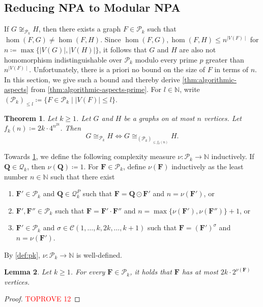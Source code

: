 \documentclass[11pt,a4paper]{article}
\theoremstyle{plain}
\newtheorem{thm}{Theorem}[section]
\newtheorem{lem}[thm]{Lemma}
\theoremstyle{remark}
\theoremstyle{definition}
\newcommand{\cyclicpermutations}{\mathscr{C}(1,\dots, k, 2k, \dots, k+1)}
\begin{document}
\subsection{Reducing NPA to Modular NPA}

If $G \not\cong_{\mathcal{P}_k} H$, then there exists a graph $F \in \mathcal{P}_k$ such that $\hom(F, G) \neq \hom(F, H)$.
Since $\hom(F, G), \hom(F, H) \leq n^{\mid V(F)\mid }$ for $n \coloneqq \max\{\lvert V(G) \rvert , \lvert V(H) \rvert \}$, 
it follows that $G$ and $H$ are also not homomorphism indistinguishable over $\mathcal{P}_k$ modulo every prime $p$ greater than $n^{\mid V(F)\mid }$.
Unfortunately, there is a priori no bound on the size of $F$ in terms of $n$.
In this section, we give such a bound and thereby derive \cref{thm:algorithmic-aspects} from \cref{thm:algorithmic-aspects-prime}.
For $l \in \mathbb{N}$, 
write $(\mathcal{P}_k)_{\leq l} \coloneqq \{ F \in \mathcal{P}_k \mid \lvert V(F)\lvert  \leq l\}$.

\begin{thm} \label{thm:witness-function}
	Let $k \geq 1$.
	Let $G$ and $H$ be a graphs on at most $n$ vertices.
	Let $f_k(n) \coloneqq 2k \cdot 4^{n^{2k}}$.
	Then 
	\[
		G \cong_{\mathcal{P}_k} H \iff
		G \cong_{(\mathcal{P}_k)_{\leq f_k(n)}} H.
	\]
\end{thm}

Towards \cref{thm:witness-function},
we define  the following complexity measure $\nu \colon \mathcal{P}_k \to \mathbb{N}$ inductively. If $\boldsymbol{Q} \in \mathcal{Q}_k$, then $\nu(\boldsymbol{Q}) \coloneqq 1$.
For $\boldsymbol{F} \in \mathcal{P}_k$, define $\nu(\boldsymbol{F})$ inductively as the least number $n \in \mathbb{N}$ such that there exist
\begin{enumerate}
	\item $\boldsymbol{F}' \in \mathcal{P}_k$ and $\boldsymbol{Q} \in \mathcal{Q}_k^P$ such that $\boldsymbol{F} = \boldsymbol{Q} \odot \boldsymbol{F}'$ and $n = \nu(\boldsymbol{F}')$, or
	\item $\boldsymbol{F}', \boldsymbol{F}'' \in \mathcal{P}_k$ such that $\boldsymbol{F} = \boldsymbol{F}' \cdot \boldsymbol{F}''$ and $n = \max\{ \nu(\boldsymbol{F}'), \nu(\boldsymbol{F}'')\} +1$, or
	\item $\boldsymbol{F}' \in \mathcal{P}_k$ and $\sigma \in \cyclicpermutations$ such that $\boldsymbol{F} = (\boldsymbol{F}')^\sigma$ and $n = \nu(\boldsymbol{F}')$.
\end{enumerate}
By \cref{def:pk}, $\nu \colon \mathcal{P}_k \to \mathbb{N}$ is well-defined.
\begin{lem} \label{lem:nu-size}
	Let $k \geq 1$.
	For every $\boldsymbol{F} \in \mathcal{P}_k$, it holds that $\boldsymbol{F}$ has at most $2k \cdot 2^{\nu(\boldsymbol{F})}$ vertices.
\end{lem}
\begin{proof}\textcolor{red}{TOPROVE 12}\end{proof}
\end{document}
